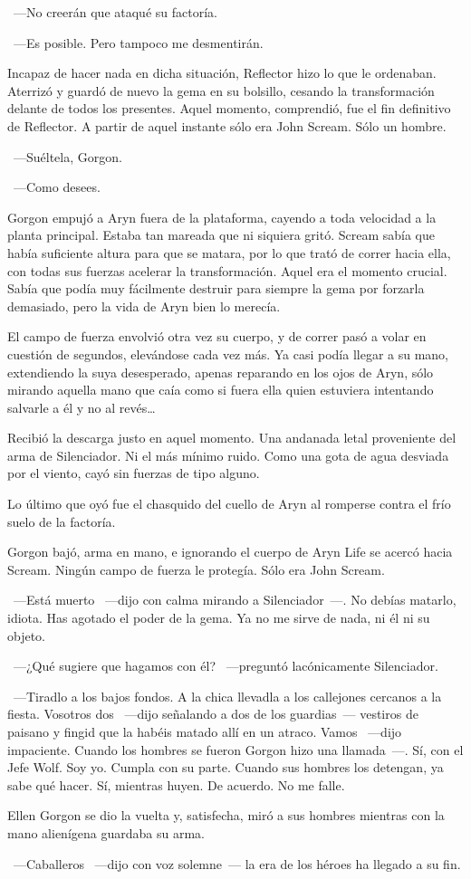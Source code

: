 ~---No creerán que ataqué su factoría.

~---Es posible. Pero tampoco me desmentirán.

Incapaz de hacer nada en dicha situación, Reflector hizo lo que le ordenaban. Aterrizó y guardó de nuevo la gema en su bolsillo, cesando la transformación delante de todos los presentes. Aquel momento, comprendió, fue el fin definitivo de Reflector. A partir de aquel instante sólo era John Scream. Sólo un hombre.

~---Suéltela, Gorgon.

~---Como desees.

Gorgon empujó a Aryn fuera de la plataforma, cayendo a toda velocidad a la planta principal. Estaba tan mareada que ni siquiera gritó. Scream sabía que había suficiente altura para que se matara, por lo que trató de correr hacia ella, con todas sus fuerzas acelerar la transformación. Aquel era el momento crucial. Sabía que podía muy fácilmente destruir para siempre la gema por forzarla demasiado, pero la vida de Aryn bien lo merecía.

El campo de fuerza envolvió otra vez su cuerpo, y de correr pasó a volar en cuestión de segundos, elevándose cada vez más. Ya casi podía llegar a su mano, extendiendo la suya desesperado, apenas reparando en los ojos de Aryn, sólo mirando aquella mano que caía como si fuera ella quien estuviera intentando salvarle a él y no al revés\dots

Recibió la descarga justo en aquel momento. Una andanada letal proveniente del arma de Silenciador. Ni el más mínimo ruido. Como una gota de agua desviada por el viento, cayó sin fuerzas de tipo alguno.

Lo último que oyó fue el chasquido del cuello de Aryn al romperse contra el frío suelo de la factoría.

Gorgon bajó, arma en mano, e ignorando el cuerpo de Aryn Life se acercó hacia Scream. Ningún campo de fuerza le protegía. Sólo era John Scream.

~---Está muerto ~---dijo con calma mirando a Silenciador~---. No debías matarlo, idiota. Has agotado el poder de la gema. Ya no me sirve de nada, ni él ni su objeto.

~---¿Qué sugiere que hagamos con él? ~---preguntó lacónicamente Silenciador.

~---Tiradlo a los bajos fondos. A la chica llevadla a los callejones cercanos a la fiesta. Vosotros dos ~---dijo señalando a dos de los guardias~--- vestiros de paisano y fingid que la habéis matado allí en un atraco. Vamos ~---dijo impaciente. Cuando los hombres se fueron Gorgon hizo una llamada~---. Sí, con el Jefe Wolf. Soy yo. Cumpla con su parte. Cuando sus hombres los detengan, ya sabe qué hacer. Sí, mientras huyen. De acuerdo. No me falle.

Ellen Gorgon se dio la vuelta y, satisfecha, miró a sus hombres mientras con la mano alienígena guardaba su arma.

~---Caballeros ~---dijo con voz solemne~--- la era de los héroes ha llegado a su fin.

\endinput
